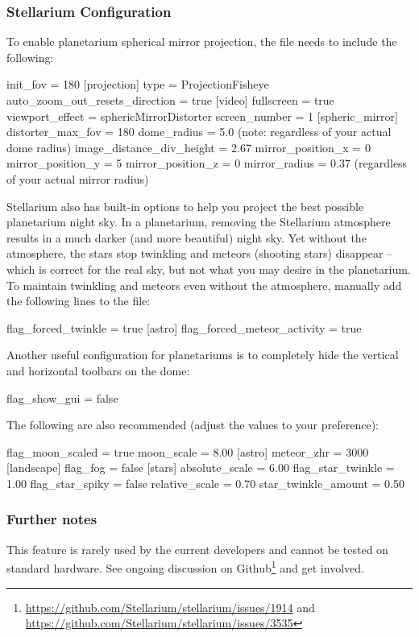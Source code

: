 \subsubsection{Stellarium Configuration}
To enable planetarium spherical mirror projection, the  file needs to include the following:

\begin{configfile}
[navigation]
init_fov = 180
[projection]
type = ProjectionFisheye
auto_zoom_out_resets_direction = true
[video]
fullscreen = true
viewport_effect = sphericMirrorDistorter
screen_number = 1
[spheric_mirror]
distorter_max_fov = 180
dome_radius = 5.0 (note: regardless of your actual dome radius)
image_distance_div_height = 2.67
mirror_position_x = 0
mirror_position_y = 5
mirror_position_z = 0
mirror_radius = 0.37 (regardless of your actual mirror radius)
\end{configfile}

Stellarium also has built-in options to help you project the best possible planetarium night sky.
In a planetarium, removing the Stellarium atmosphere results in a much darker (and more beautiful) night sky.
Yet without the atmosphere, the stars stop twinkling and meteors (shooting stars) disappear -- which is correct
for the real sky, but not what you may desire in the planetarium. To maintain twinkling and meteors even without
the atmosphere, manually add the following lines to the  file:

\begin{configfile}
[stars]
flag_forced_twinkle = true
[astro]
flag_forced_meteor_activity = true
\end{configfile}

Another useful configuration for planetariums is to completely hide the vertical and horizontal toolbars on the
dome:
\begin{configfile}
[gui]
flag_show_gui = false
\end{configfile}

The following are also recommended (adjust the values to your preference):
\begin{configfile}
[viewing]
flag_moon_scaled = true
moon_scale = 8.00
[astro]
meteor_zhr = 3000
[landscape]
flag_fog = false
[stars]
absolute_scale = 6.00
flag_star_twinkle = 1.00
flag_star_spiky = false
relative_scale = 0.70
star_twinkle_amount = 0.50
\end{configfile}


\subsubsection{Further notes}
This feature is rarely used by the current developers and cannot be tested on standard hardware. 
See ongoing discussion on Github\footnote{\url{https://github.com/Stellarium/stellarium/issues/1914} and \\
\url{https://github.com/Stellarium/stellarium/issues/3535}} and get involved.


